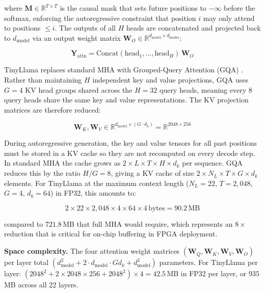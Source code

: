 \noindent where $\mathbf{M} \in \mathbb{R}^{T \times T}$ is the causal
mask that sets future positions to $-\infty$ before the softmax, enforcing
the autoregressive constraint that position $i$ may only attend to
positions $\leq i$. The outputs of all $H$ heads are concatenated and
projected back to $d_{\text{model}}$ via an output weight matrix
$\mathbf{W}_O \in \mathbb{R}^{d_{\text{model}} \times d_{\text{model}}}$:

\begin{equation}
  \mathbf{Y}_{\text{attn}} =
    \text{Concat}(\text{head}_1, \ldots, \text{head}_H)\,\mathbf{W}_O
  \label{eq:mha_output}
\end{equation}

TinyLlama replaces standard MHA with Grouped-Query Attention (GQA)
\cite{ainslie2023gqa}. Rather than maintaining $H$ independent key and value
projections, GQA uses $G = 4$ KV head groups shared across the $H = 32$
query heads, meaning every 8 query heads share the same key and value
representations. The KV projection matrices are therefore reduced:

\begin{equation}
  \mathbf{W}_K, \mathbf{W}_V \in
    \mathbb{R}^{d_{\text{model}} \times (G \cdot d_k)}
  = \mathbb{R}^{2048 \times 256}
  \label{eq:gqa_kv_weight}
\end{equation}

During autoregressive generation, the key and value tensors for all past
positions must be stored in a KV cache so they are not recomputed on every
decode step. In standard MHA the cache grows as
$2 \times L \times T \times H \times d_k$ per sequence. GQA reduces this
by the ratio $H/G = 8$, giving a KV cache of size
$2 \times N_L \times T \times G \times d_k$ elements. For TinyLlama at the
maximum context length ($N_L = 22$, $T = 2{,}048$, $G = 4$, $d_k = 64$) in
FP32, this amounts to:

\begin{equation}
  2 \times 22 \times 2{,}048 \times 4 \times 64 \times 4\,\text{bytes}
  = 90.2\,\text{MB}
  \label{eq:kv_cache_size}
\end{equation}

\noindent compared to $721.8$\,MB that full MHA would require, which represents an
$8\times$ reduction that is critical for on-chip buffering in FPGA
deployment.

\noindent\textbf{Space complexity.} The four attention weight matrices
$(\mathbf{W}_Q, \mathbf{W}_K, \mathbf{W}_V, \mathbf{W}_O)$ per layer
total $(d_{\text{model}}^2 + 2 \cdot d_{\text{model}} \cdot G d_k
+ d_{\text{model}}^2)$ parameters. For TinyLlama per layer:
$(2048^2 + 2 \times 2048 \times 256 + 2048^2) \times 4 = 42.5$\,MB in
FP32 per layer, or $935$\,MB across all 22 layers.

